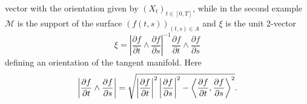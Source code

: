 \documentclass{article}
\begin{document}
vector with the orientation given by $\left( X_{t}\right) _{t\in \left[ 0,T%
\right] }$, while in the second example $\mathcal{M}$ is the support of the
surface $\left( f\left( t,s\right) \right) _{(t,s)\in A}$ and $\xi $ is the
unit $2$-vector 
\begin{equation*}
\xi =\left| \frac{\partial f}{\partial t}\wedge \frac{\partial f}{\partial s}%
\right| ^{-1}\frac{\partial f}{\partial t}\wedge \frac{\partial f}{\partial s%
}
\end{equation*}
defining an orientation of the tangent manifold. Here 
\begin{equation*}
\left| \frac{\partial f}{\partial t}\wedge \frac{\partial f}{\partial s}%
\right| =\sqrt{\left| \frac{\partial f}{\partial t}\right| ^{2}\left| \frac{%
\partial f}{\partial s}\right| ^{2}-\left\langle \frac{\partial f}{\partial t%
},\frac{\partial f}{\partial s}\right\rangle ^{2}}.
\end{equation*}
\end{document}
